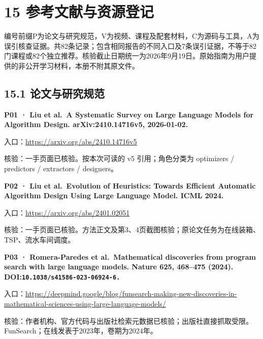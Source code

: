 \clearpage
\section{15
参考文献与资源登记}\label{ux53c2ux8003ux6587ux732eux4e0eux8d44ux6e90ux767bux8bb0}

编号前缀P为论文与研究规范，V为视频、课程及配套材料，C为源码与工具，A为误引核查证据。共82条记录；包含相同报告的不同入口及7条误引证据，不等于82门课程或82个独立推荐。核验截止日期统一为2026年9月19日。原始指南为用户提供的非公开学习材料，本册不附其原文件。

\subsection{15.1
论文与研究规范}\label{ux8bbaux6587ux4e0eux7814ux7a76ux89c4ux8303}

\par\noindent\begin{minipage}{\linewidth}
\textbf{P01 · Liu et al.~A Systematic Survey on Large Language Models
for Algorithm Design. arXiv:\allowbreak{}2410.14716v5, 2026-01-02.}

入口：\url{https://arxiv.org/abs/2410.14716v5}

核验：一手页面已核验。按本次可读的 v5 引用；角色分类为 optimizers /
predictors / extractors / designers。
\end{minipage}\par\vspace{6pt}

\par\noindent\begin{minipage}{\linewidth}
\textbf{P02 · Liu et al.~Evolution of Heuristics: Towards Efficient
Automatic Algorithm Design Using Large Language Model. ICML 2024.}

入口：\url{https://arxiv.org/abs/2401.02051}

核验：一手页面已核验。方法正文及第3、4页截图核验；原论文任务为在线装箱、TSP、流水车间调度。
\end{minipage}\par\vspace{6pt}

\par\noindent\begin{minipage}{\linewidth}
\textbf{P03 · Romera-Paredes et al.~Mathematical discoveries from
program search with large language models. Nature 625, 468--475 (2024).
DOI:\allowbreak\nolinkurl{10.1038/s41586-023-06924-6.}}

入口：\url{https://deepmind.google/blog/funsearch-making-new-discoveries-in-mathematical-sciences-using-large-language-models/}

核验：作者机构、官方代码与出版社检索元数据已核验；出版社直接抓取受限。FunSearch；在线发表于2023年，卷期为2024年。
\end{minipage}\par\vspace{6pt}

